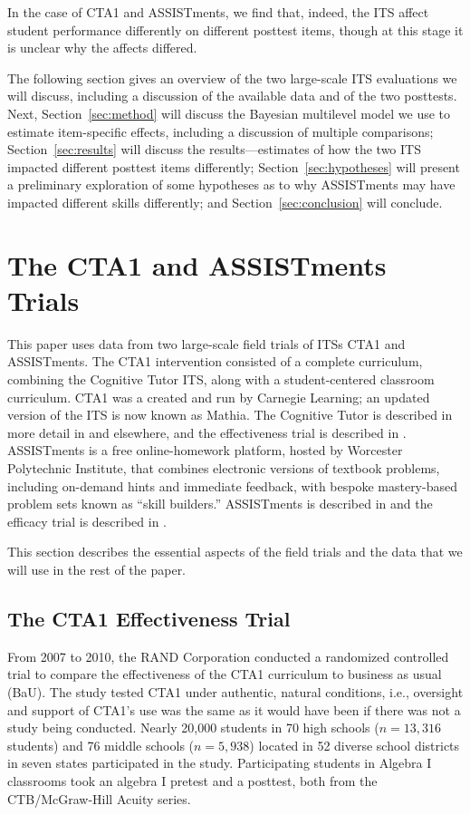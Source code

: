 \documentclass{edm_article}
\begin{document}
In the case of CTA1 and ASSISTments, we find that, indeed, the ITS
affect student performance differently on different posttest items,
though at this stage it is unclear why the affects differed. 

The following section gives an overview of the two large-scale ITS
evaluations we will discuss, including a discussion of the available
data and of the two posttests. Next, Section~\ref{sec:method} will
discuss the Bayesian multilevel model we use to estimate item-specific
effects, including a discussion of multiple comparisons;
Section~\ref{sec:results} will discuss the results---estimates of how
the two ITS impacted different posttest items differently;
Section~\ref{sec:hypotheses} will present a preliminary exploration of
some hypotheses as to why ASSISTments may have impacted different
skills differently; and Section~\ref{sec:conclusion} will conclude.


\section{The CTA1 and ASSISTments Trials}
This paper uses data from two large-scale field trials of ITSs CTA1
and ASSISTments. The CTA1 intervention consisted of a complete curriculum,
combining the Cognitive Tutor ITS, along with a student-centered
classroom curriculum. CTA1 was a created and run by Carnegie Learning;
an updated version of the ITS is now known as Mathia. The Cognitive
Tutor is described in more detail in \cite{anderson1995cognitive} and
elsewhere, and the effectiveness trial is described in \cite{pane2014effectiveness}.
ASSISTments is a free online-homework platform, hosted by Worcester
Polytechnic Institute, that combines electronic versions of textbook
problems, including on-demand hints and immediate feedback, with
bespoke mastery-based problem sets known as ``skill builders.''
ASSISTments is described in \cite{heffernan2014assistments} and the
efficacy trial is described in \cite{roschelle2016online}.

This section describes the essential aspects of the field trials and
the data that we will use in the rest of the paper. 

\subsection{The CTA1 Effectiveness Trial}
From 2007 to 2010, the RAND Corporation conducted a randomized
controlled trial to compare the effectiveness of the CTA1 curriculum
to business as usual (BaU). The study tested CTA1 under authentic, natural
conditions, i.e., oversight and support of CTA1's use was the same as
it would have been if there was not a study being conducted. Nearly
20,000 students in 70 high schools ($n=13,316$ students) and 76 middle
schools ($n=5,938$) located in 52
diverse school districts in seven states participated in the
study. Participating students in Algebra I classrooms took an algebra
I pretest and a posttest, both from the CTB/McGraw-Hill Acuity series. 
\end{document}
